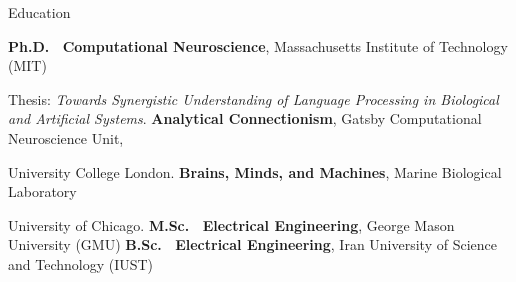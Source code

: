 \begin{rubric}{Education}
\entry*[2016 -- 2024]%

	\textbf{Ph.D. ~Computational Neuroscience}, Massachusetts Institute of Technology (MIT)\par
 Thesis: \emph{Towards Synergistic Understanding of Language Processing in Biological and Artificial Systems}.
\entry*[2023]%
	\textbf{Analytical Connectionism}, Gatsby Computational Neuroscience Unit,\par University College London.
\entry*[2017]%
	\textbf{Brains, Minds, and Machines}, Marine Biological Laboratory\par University of Chicago.
%
\entry*[2012 -- 2014]%
	\textbf{M.Sc. ~Electrical Engineering}, George Mason University (GMU)
%
\entry*[2005 -- 2010]%
	\textbf{B.Sc. ~Electrical Engineering}, Iran University of Science and Technology (IUST)
\end{rubric}